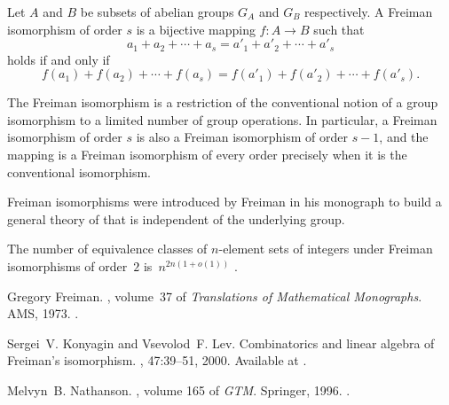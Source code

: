 \documentclass[12pt]{article}
\begin{document}
Let $A$ and $B$ be subsets of abelian groups $G_A$ and $G_B$
respectively. A Freiman isomorphism of order $s$ is a bijective mapping 
$f\colon A\to B$ such that
\begin{equation*}
a_1+a_2+\dotsb+a_s=a'_1+a'_2+\dotsb+a'_s
\end{equation*}
holds if and only if
\begin{equation*}
f(a_1)+f(a_2)+\dotsb+f(a_s)=f(a'_1)+f(a'_2)+\dotsb+f(a'_s).
\end{equation*}

The Freiman isomorphism is a restriction of the conventional notion of
a group isomorphism to a limited number of group operations. In
particular, a Freiman isomorphism of order $s$ is also a Freiman
isomorphism of order $s-1$, and the mapping is a Freiman isomorphism of
every order precisely when it is the conventional isomorphism.

Freiman isomorphisms were introduced by Freiman in his monograph
\cite{cite:freiman_setaddition} to build a general theory of
 that is independent of the
underlying group.

The number of equivalence classes of $n$-element sets of integers under Freiman isomorphisms of order~$2$ is~$n^{2n(1+o(1))}$
\cite{cite:lev_konyagin_freimannonism}.


\begin{thebibliography}{1}

Gregory Freiman.
, volume~37 of
  {\em Translations of Mathematical Monographs}.
\newblock AMS, 1973.
\newblock {}.

Sergei~V. Konyagin and Vsevolod~F. Lev.
\newblock Combinatorics and linear algebra of {F}reiman's isomorphism.
, 47:39--51, 2000.
\newblock Available at .

Melvyn~B. Nathanson.
, volume 165 of {\em GTM}.
\newblock Springer, 1996.
\newblock {}.

\end{thebibliography}
\end{document}
